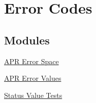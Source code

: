\hypertarget{group__apr__errno}{\section{Error Codes}
\label{group__apr__errno}
}
\subsection*{Modules}
\begin{DoxyCompactItemize}
\item 
\hyperlink{group___a_p_r___e_r_r_o_r__map}{A\-P\-R Error Space}
\item 
\hyperlink{group___a_p_r___error}{A\-P\-R Error Values}
\item 
\hyperlink{group___a_p_r___s_t_a_t_u_s___i_s}{Status Value Tests}
\end{DoxyCompactItemize}
